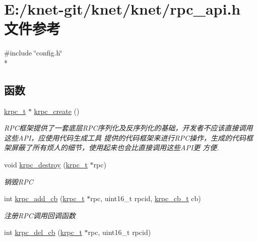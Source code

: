 \hypertarget{a00077}{}\section{E\+:/knet-\/git/knet/knet/rpc\+\_\+api.h 文件参考}
\label{a00077}
{\ttfamily \#include \char`\"{}config.\+h\char`\"{}}\\*
\subsection*{函数}
\begin{DoxyCompactItemize}
\item 
\hyperlink{a00047_a1e414ac6f6de24462ccf81e10f63428d_a1e414ac6f6de24462ccf81e10f63428d}{krpc\+\_\+t} $\ast$ \hyperlink{a00077_a5d55f838d222f44965d99eac9a0381c1_a5d55f838d222f44965d99eac9a0381c1}{krpc\+\_\+create} ()
\begin{DoxyCompactList}\small\item\em R\+P\+C框架提供了一套底层\+R\+P\+C序列化及反序列化的基础，开发者不应该直接调用这些\+A\+P\+I，应使用代码生成工具 提供的代码框架来进行\+R\+P\+C操作，生成的代码框架屏蔽了所有烦人的细节，使用起来也会比直接调用这些\+A\+P\+I更 方便. \end{DoxyCompactList}\item 
void \hyperlink{a00077_ab07c8ccf1abc99b85f455a2f4280ac76_ab07c8ccf1abc99b85f455a2f4280ac76}{krpc\+\_\+destroy} (\hyperlink{a00047_a1e414ac6f6de24462ccf81e10f63428d_a1e414ac6f6de24462ccf81e10f63428d}{krpc\+\_\+t} $\ast$rpc)
\begin{DoxyCompactList}\small\item\em 销毁\+R\+P\+C \end{DoxyCompactList}\item 
int \hyperlink{a00077_aa12a9874d2b0308994c3fa651cdbbd61_aa12a9874d2b0308994c3fa651cdbbd61}{krpc\+\_\+add\+\_\+cb} (\hyperlink{a00047_a1e414ac6f6de24462ccf81e10f63428d_a1e414ac6f6de24462ccf81e10f63428d}{krpc\+\_\+t} $\ast$rpc, uint16\+\_\+t rpcid, \hyperlink{a00047_a06bb708c1b97445d3a5d0c1b32ad2ab6_a06bb708c1b97445d3a5d0c1b32ad2ab6}{krpc\+\_\+cb\+\_\+t} cb)
\begin{DoxyCompactList}\small\item\em 注册\+R\+P\+C调用回调函数 \end{DoxyCompactList}\item 
int \hyperlink{a00077_a76529ccab5c6f0ada79cac791e299ef9_a76529ccab5c6f0ada79cac791e299ef9}{krpc\+\_\+del\+\_\+cb} (\hyperlink{a00047_a1e414ac6f6de24462ccf81e10f63428d_a1e414ac6f6de24462ccf81e10f63428d}{krpc\+\_\+t} $\ast$rpc, uint16\+\_\+t rpcid)

\end{DoxyCompactItemize}
